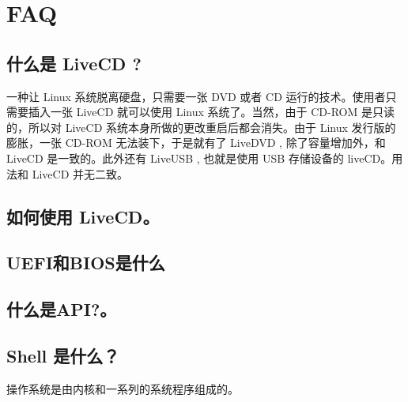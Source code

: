 \renewcommand{\thesection}{\arabic{section}}

\chapter{FAQ}\label{FAQ}

\section{什么是 LiveCD ?}\label{FAQ:LiveCD}
一种让 Linux 系统脱离硬盘，只需要一张 DVD 或者 CD 运行的技术。使用者只需要插入一张 LiveCD 就可以使用 Linux  系统了。当然，由于 CD-ROM 是只读的，所以对 LiveCD 系统本身所做的更改重启后都会消失。由于 Linux 发行版的膨胀，一张 CD-ROM 无法装下，于是就有了 LiveDVD , 除了容量增加外，和LiveCD 是一致的。此外还有 LiveUSB , 也就是使用 USB 存储设备的 liveCD。用法和 LiveCD 并无二致。

\section{如何使用 LiveCD。}\label{FAQ:UseLiveCD}

\section{UEFI和BIOS是什么}


\section{什么是API?。}\label{FAQ:API}

\section{Shell 是什么？}
操作系统是由内核和一系列的系统程序组成的。
